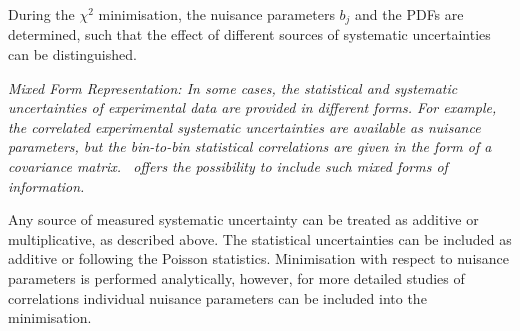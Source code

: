 \begin{description}
During the $\chi^2$ minimisation, the nuisance parameters $b_j$ and the PDFs are determined, such that the effect of different sources of systematic uncertainties can be distinguished.
\item  \it{Mixed Form Representation:} \rm
In some cases, the statistical and systematic uncertainties of experimental data are provided in different forms.    
For example, the correlated experimental systematic uncertainties are available as nuisance parameters,
but the bin-to-bin statistical correlations are given in the form of a covariance matrix.
\fitter\ offers the possibility to include such mixed forms of information. 
\end{description}
Any source of measured systematic uncertainty can be treated as additive or multiplicative, as described above. 
The statistical uncertainties can be included as additive or following the Poisson statistics. Minimisation
with respect to nuisance parameters is performed analytically, however, for more 
detailed studies of correlations individual nuisance parameters can be included into 
the \minuit minimisation.


